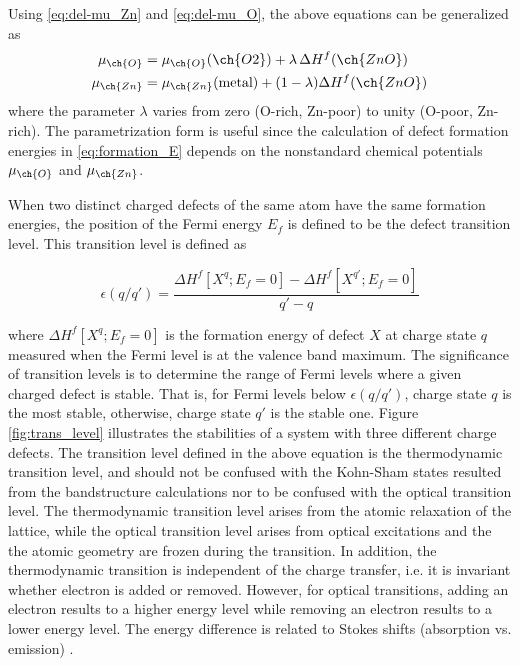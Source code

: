 Using \eqref{eq:del-mu_Zn} and \eqref{eq:del-mu_O}, the above equations can be generalized as \citep{Sun2012}
\begin{align}
    \mu_{\ch{O}} &= \mu_{\ch{O}}(\ch{O2}) + \lambda\, \Delta H^f (\ch{ZnO}) \\ 
    \mu_{\ch{Zn}} &= \mu_{\ch{Zn}}(\text{metal}) + (1 - \lambda) \Delta H^f (\ch{ZnO})
\end{align}
where the parameter $\lambda$ varies from zero (O-rich, Zn-poor) to unity (O-poor, Zn-rich). The parametrization form is useful since the calculation of defect formation energies in \eqref{eq:formation_E} depends on the nonstandard chemical potentials $\mu_{\ch{O}}$ and $\mu_{\ch{Zn}}$.

When two distinct charged defects of the same atom have the same formation energies, the position of the Fermi energy $E_f$ is defined to be  the defect transition level. This transition level is defined as \citep{Janotti2007}

\begin{equation}
    \epsilon(q/q')  = \frac{\Delta H^f[X^q;E_f=0] - \Delta H^f[X^{q'};E_f=0]}{q' - q}
\end{equation}

where $\Delta H^f[X^q;E_f=0] $ is the formation energy of defect $X$ at charge state $q$ measured when the Fermi level is at the valence band maximum.  The significance of transition levels is to determine the range of Fermi levels where a given charged defect is stable. That is, for Fermi levels below $\epsilon(q/q')$, charge state $q$ is the most stable, otherwise, charge state $q'$ is the stable one. Figure \ref{fig:trans_level} illustrates the stabilities of a system with three different charge defects. The transition level defined in the above equation is the thermodynamic transition level, and should not be confused with the Kohn-Sham states resulted from the bandstructure calculations nor to be confused with the optical transition level. The thermodynamic transition level arises from the atomic relaxation of the lattice, while the optical transition level arises from optical excitations and the the atomic geometry are frozen during the transition.  In addition, the thermodynamic transition is independent of the charge transfer, i.e. it is invariant whether electron is added or removed. However, for optical transitions, adding an electron results to a higher energy level   while removing  an electron results to a lower energy level. The energy difference is related to Stokes shifts (absorption vs. emission) \citep{Freysoldt2014}. 

